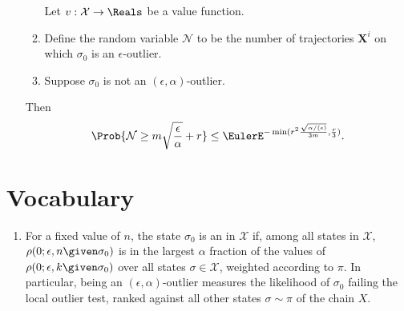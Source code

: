 \documentclass[12pt]{article}
\begin{document}
\begin{enumerate}
\begin{theorem}
\begin{enumerate}
                    Let \( v :  \mathcal{X} \to \Reals \) be a value
                    function.
                \item
                    Define the random variable \( \mathcal{N} \) to be
                    the number of trajectories \( \mathbf{X}^i \) on
                    which \( \sigma_0 \) is an \( \epsilon \)-outlier.
                \item
                    Suppose \( \sigma_0 \) is not an \( (\epsilon,
                    \alpha) \)-outlier.
            \end{enumerate}
            Then
            \[
                \Prob{\mathcal{N} \ge m \sqrt{\frac{\epsilon}{\alpha}} +
                r} \le \EulerE^{-\min(r^2 \frac{\sqrt{\alpha/(\epsilon)}}
                {3m}, \frac{r} {3})}.
            \]
        \end{theorem}
\end{enumerate}

\hr

\section*{Vocabulary}
\begin{enumerate}
    \item
        For a fixed value of \( n \), the state \( \sigma_0 \) is an
         in \( \mathcal{X} \) if,
        among all states in \( \mathcal{X} \), \( \rho(0; \epsilon, n
        \given \sigma_{0}) \) is in the largest \( \alpha \) fraction of
        the values of \( \rho(0; \epsilon, k \given \sigma_{0}) \) over
        all states \( \sigma \in \mathcal{X} \), weighted according to \(
        \pi \).  In particular, being an \( (\epsilon, \alpha) \)-outlier
        measures the likelihood of \( \sigma_0 \) failing the local
        outlier test, ranked against all other states \( \sigma \sim \pi
        \) of the chain \( X \).
\end{enumerate}

\hr
\end{document}
